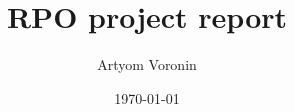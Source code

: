 \documentclass[11pt]{article}
\title{RPO project report}
\author{Artyom Voronin}
\date{\today}
\begin{document}
\maketitle	

\tableofcontents
\pagebreak


\pagebreak    

\pagebreak    


\pagebreak    


\pagebreak    




\end{document}
